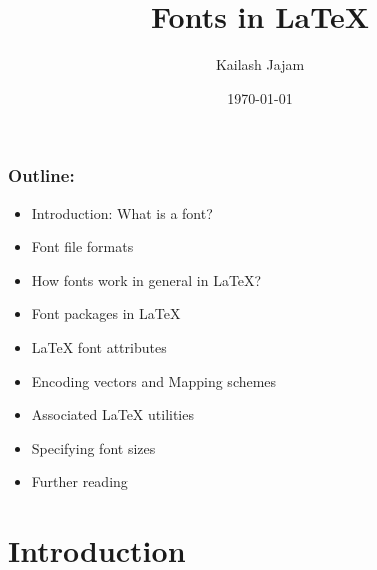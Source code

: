 \documentclass{beamer}
\title{Fonts in \LaTeX}
\author{{Kailash Jajam}}
\institute{Dept. of Mechanical Engineering\\ Auburn University, AL}
\date{\today}
\begin{document}
\frame{\titlepage}


\begin{frame}[fragile]
\frametitle{Outline:}
\vspace{-0.3cm}

\begin{itemize}
\item Introduction: What is a font?
\item Font file formats
\item How fonts work in general in \LaTeX{}?
\item Font packages in \LaTeX{}
\item \LaTeX{} font attributes
\item Encoding vectors and Mapping schemes
\item Associated \LaTeX{} utilities
\item Specifying font sizes
\item Further reading
\end{itemize}
\end{frame}

\section{Introduction}
\end{document}
